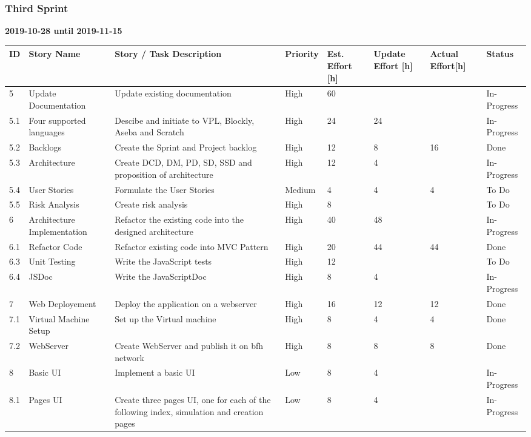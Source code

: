 \documentclass{scrartcl}
\begin{document}
\subsubsection{Third Sprint}
\textbf{2019-10-28 until 2019-11-15}
\begin{longtable}{p{5mm}|p{2cm}|p{4cm}|p{1cm}|p{1cm}|p{1cm}|p{1cm}|p{15mm}}
  ID                     & Story Name & Story / Task Description & Priority & Est. Effort {[}h{]} & Update Effort {[}h{]} & Actual Effort{[}h{]} & Status                \\ \hline
  5 & Update Documentation & Update existing documentation & High & 60 &  &  & In-Progress \\
  5.1 & Four supported languages & Descibe and initiate to VPL, Blockly, Aseba and Scratch & High & 24 & 24 &  & In-Progress \\ 
  5.2 & Backlogs & Create the Sprint and Project backlog & High & 12 & 8 & 16 & Done \\ 
  5.3 & Architecture & Create DCD, DM, PD, SD, SSD and proposition of architecture & High & 12 & 4 &  & In-Progress \\
  5.4 & User Stories & Formulate the User Stories & Medium & 4 & 4 & 4 & To Do \\ 
  5.5 & Risk Analysis & Create risk analysis & High & 8 &  &  & To Do \\ 
  6 & Architecture Implementation & Refactor the existing code into the designed architecture & High & 40 & 48 &  & In-Progress \\ 
  6.1 & Refactor Code & Refactor existing code into MVC Pattern & High & 20 & 44 & 44 & Done \\ 
  6.3 & Unit Testing & Write the JavaScript tests & High & 12 &  &  & To Do \\
  6.4 & JSDoc & Write the JavaScriptDoc & High & 8 & 4 &  & In-Progress \\ 
  7 & Web Deployement & Deploy the application on a webserver & High & 16 & 12 & 12 & Done \\ 
  7.1 & Virtual Machine Setup & Set up the Virtual machine & High & 8 & 4 & 4 & Done \\ 
  7.2 & WebServer & Create WebServer and publish it on bfh network & High & 8 & 8 & 8 & Done \\
  8 & Basic UI & Implement a basic UI & Low & 8 & 4 &  & In-Progress \\ 
  8.1 & Pages UI & Create three pages UI, one for each of the following index, simulation and creation pages & Low & 8 & 4 &  & In-Progress \\
\end{longtable}
\end{document}
